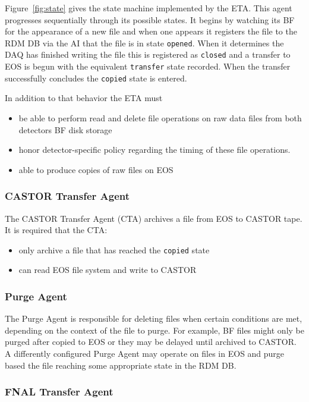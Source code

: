 \documentclass[pdftex,12pt,letter]{article}
\begin{document}
Figure~\ref{fig:state} gives the state machine implemented by the ETA.
This agent progresses sequentially through its possible states.  It
begins by watching its BF for the appearance of a new file and when
one appears it registers the file to the RDM DB via the AI that the
file is in state \texttt{opened}.  When it determines the DAQ has
finished writing the file this is registered as \texttt{closed} and a
transfer to EOS is begun with the equivalent \texttt{transfer} state
recorded.  When the transfer successfully concludes the
\texttt{copied} state is entered.

In addition to that behavior the ETA must
\begin{itemize}
\item be able to perform read and delete file operations on raw data
  files from both detectors BF disk storage
\item honor detector-specific policy regarding the timing of these
  file operations.
\item able to produce copies of raw files on EOS
\end{itemize}


\subsubsection{CASTOR Transfer Agent}

The CASTOR Transfer Agent (CTA) archives a file from EOS to CASTOR
tape.  It is required that the CTA:

\begin{itemize}
\item only archive a file that has reached the \texttt{copied} state
\item can read EOS file system and write to CASTOR
\end{itemize}

\subsubsection{Purge Agent}

The Purge Agent is responsible for deleting files when certain
conditions are met, depending on the context of the file to purge.
For example, BF files might only be purged after copied to EOS or they
may be delayed until archived to CASTOR.  A differently configured
Purge Agent may operate on files in EOS and purge based the file
reaching some appropriate state in the RDM DB.

\subsubsection{FNAL Transfer Agent}
\end{document}
